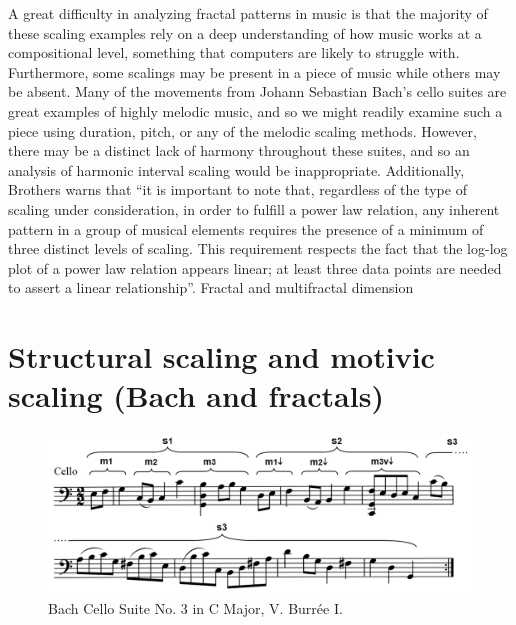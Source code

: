 \documentclass{article}
\begin{document}
A great difficulty in analyzing fractal patterns in music is that the majority
of these scaling examples rely on a deep understanding of how music works at a
compositional level, something that computers are likely to struggle with.
Furthermore, some scalings may be present in a piece of music while others may
be absent. Many of the movements from Johann Sebastian Bach’s cello suites are
great examples of highly melodic music, and so we might readily examine such a
piece using duration, pitch, or any of the melodic scaling methods. However,
there may be a distinct lack of harmony throughout these suites, and so an
analysis of harmonic interval scaling would be inappropriate.
%
Additionally,
Brothers warns that ``it is important to note that, regardless of the type of
scaling under consideration, in order to fulfill a power law relation, any
inherent pattern in a group of musical elements requires the presence of a
minimum of three distinct levels of scaling. This requirement respects the fact
that the log-log plot of a power law relation appears linear; at least three
data points are needed to assert a linear relationship''\cite{2}.
Fractal and multifractal dimension

\section{Structural scaling and motivic scaling (Bach and fractals)}

\begin{figure}[ht!]
    \centering
    \includegraphics[width=\linewidth]{figures/bach_cello.png}
    \caption{%
        Bach Cello Suite No. 3 in C Major, V. Burrée I.
    }\label{fig:bach}
\end{figure}
\end{document}
